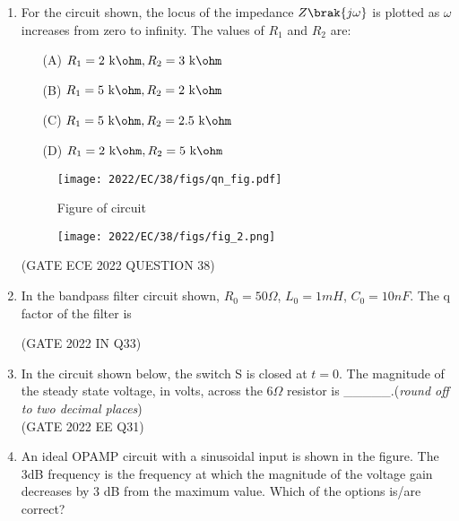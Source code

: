 \begin{enumerate}[label=\thechapter.\arabic*,ref=\thechapter.\theenumi]
\item For the circuit shown, the locus of the impedance $ Z\brak{j\omega}$ is plotted as $ \omega$ increases from zero to infinity. The values of $ R_1$ and $ R_2$ are:
\begin{enumerate}
    \item[(A)] $ R_1 = 2\text{ k\ohm}, R_2 = 3\text{ k\ohm}$
    \item[(B)]$ R_1 = 5\text{ k\ohm}, R_2 = 2\text{ k\ohm}$
    \item[(C)] $ R_1 = 5\text{ k\ohm}, R_2 = 2.5\text{ k\ohm}$
    \item[(D)] $ R_1 = 2\text{ k\ohm}, R_2 = 5\text{ k\ohm}$
\end{enumerate}

\begin{figure}[h!]
    \texttt{[image: 2022/EC/38/figs/qn\_fig.pdf]}
    \caption{Figure of circuit}
    \centering
    \label{fig: ece38_qn_fig}
\end{figure}

\begin{figure}[h!]
    \texttt{[image: 2022/EC/38/figs/fig\_2.png]}
    \caption{}
    \centering
    \label{fig: ece38qn_2_fig}
\end{figure}
\hfill(GATE ECE 2022 QUESTION 38)\\
\solution

\pagebreak

\item In the bandpass filter circuit shown, $R_0 = 50\Omega$, $L_0 = 1 mH$, $C_0 = 10nF$. The q factor of the filter is 

\hfill(GATE 2022 IN Q33)\\
\solution

\pagebreak

\item In the circuit shown below, the switch S is closed at $t=0$. The magnitude of the steady state voltage, in volts, across the $6\Omega$ resistor is \_\_\_\_\_.(\textit{round off to two decimal places})\\ \hfill(GATE 2022 EE Q31)
\\
\solution

\pagebreak

\item An ideal OPAMP circuit with a sinusoidal input is shown in the figure. The 3dB frequency is the frequency at which the magnitude of the voltage gain decreases by 3 dB from the maximum value. Which of the options is/are correct?


\end{enumerate}
